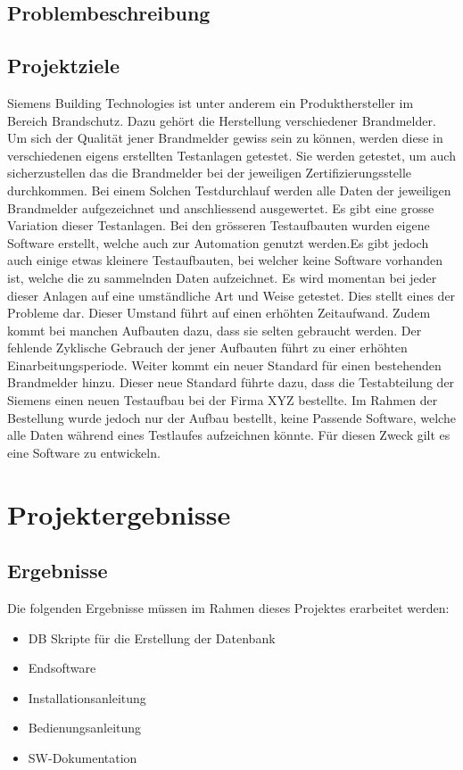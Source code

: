 \documentclass[10pt]{scrartcl}
\begin{document}
\subsection{Problembeschreibung}
\subsection{Projektziele}
Siemens Building Technologies ist unter anderem ein Produkthersteller im Bereich Brandschutz. Dazu gehört die Herstellung verschiedener Brandmelder. Um sich der Qualität jener Brandmelder gewiss sein zu können, werden diese in verschiedenen eigens erstellten Testanlagen getestet. Sie werden getestet, um auch sicherzustellen das die Brandmelder bei der jeweiligen Zertifizierungsstelle durchkommen. Bei einem Solchen Testdurchlauf werden alle Daten der jeweiligen Brandmelder aufgezeichnet und anschliessend ausgewertet.\newline
Es gibt eine grosse Variation dieser Testanlagen. Bei den grösseren Testaufbauten wurden eigene Software erstellt, welche auch zur Automation genutzt werden.Es gibt jedoch auch einige etwas kleinere Testaufbauten, bei welcher keine Software vorhanden ist, welche die zu sammelnden Daten aufzeichnet. Es wird momentan bei jeder dieser Anlagen auf eine umständliche Art und Weise getestet.
Dies stellt eines der Probleme dar. Dieser Umstand führt auf einen erhöhten Zeitaufwand. Zudem kommt bei manchen Aufbauten dazu, dass sie selten gebraucht werden. Der fehlende Zyklische Gebrauch der jener Aufbauten führt zu einer erhöhten Einarbeitungsperiode.
Weiter kommt ein neuer Standard für einen bestehenden Brandmelder hinzu. Dieser neue Standard führte dazu, dass die Testabteilung der Siemens einen neuen Testaufbau bei der Firma XYZ bestellte. Im Rahmen der Bestellung wurde jedoch nur der Aufbau bestellt, keine Passende Software, welche alle Daten während eines Testlaufes aufzeichnen könnte. Für diesen Zweck gilt es eine Software zu entwickeln. 
\section{Projektergebnisse}
\subsection{Ergebnisse}
Die folgenden Ergebnisse müssen im Rahmen dieses Projektes erarbeitet werden:
\begin{itemize}
	\item DB Skripte für die Erstellung der Datenbank
	\item Endsoftware
	\item Installationsanleitung
	\item Bedienungsanleitung
	\item SW-Dokumentation
\end{itemize}
\end{document}
